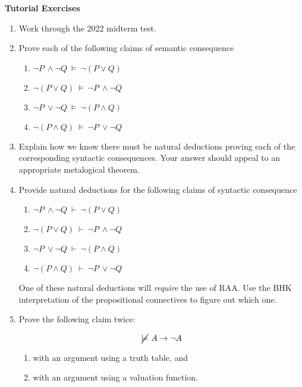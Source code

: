 \documentclass[11pt]{report}
\begin{document}
\newpage
{\bf Tutorial Exercises}
\begin{enumerate}
	
	\item Work through the 2022 midterm test. 
	
	\item Prove each of the following claims of semantic consequence 

		\begin{enumerate}
			\item $\lnot P \ \land \lnot Q \ \models \ \lnot(P \lor Q)$
			\item $\lnot(P \lor Q) \ \models \ \lnot P \ \land \lnot Q$
			\item $\lnot P \ \lor \lnot Q \ \models \ \lnot(P \land Q)$
			\item $\lnot(P \land Q) \ \models \ \lnot P \ \lor \lnot Q$
		\end{enumerate}

	\item Explain how we know there must be natural deductions proving each of the corresponding syntactic consequences. Your answer should appeal to an appropriate metalogical theorem. 

	\item Provide natural deductions for the following claims of syntactic consequence 

		\begin{enumerate}
			\item $\lnot P \ \land \lnot Q \ \vdash \ \lnot(P \lor Q)$
			\item $\lnot(P \lor Q) \ \vdash \ \lnot P \ \land \lnot Q$
			\item $\lnot P \ \lor \lnot Q \ \vdash \ \lnot(P \land Q)$
			\item $\lnot(P \land Q) \ \vdash \ \lnot P \ \lor \lnot Q$
		\end{enumerate}
	
	One of these natural deductions will \emph{require} the use of RAA. Use the BHK interpretation of the propositional connectives to figure out which one.

	\item Prove the following claim twice:
	
		$$ \cancel{\models} \ A \to \lnot A$$

		\begin{enumerate}
			\item with an argument using a truth table, and
			\item with an argument using a valuation function.
		\end{enumerate}
		
	

\end{enumerate}
	
\end{document}
